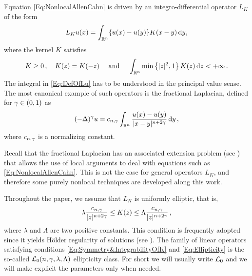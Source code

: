 

Equation \eqref{Eq:NonlocalAllenCahn} is driven by an integro-differential operator $L_K$ of the form
\begin{equation}
\label{Eq:DefOfLu}
L_Ku(x) = \int_{\mathbb{R}^n} \{u(x) - u(y)\} K(x-y)\,\mathrm{d} y,
\end{equation}
where the kernel $K$ satisfies
\begin{equation}
\label{Eq:Symmetry&IntegrabilityOfK}
K\geq 0\,, \quad K(z) = K(-z) \quad \textrm{ and } \quad \int_{\mathbb{R}^n} \min \left\{ |z|^2, 1 \right\} K(z) \,\mathrm{d} z < + \infty\,.
\end{equation}
The integral in \eqref{Eq:DefOfLu} has to be understood in the principal value sense. The most canonical example of such operators is the fractional Laplacian, defined for $\gamma\in(0,1)$ as
$$
(-\Delta)^\gamma u = c_{n, \gamma} \int_{\mathbb{R}^n} \dfrac{u(x) - u(y)}{|x-y|^{n + 2\gamma}}\,\mathrm{d} y\,,
$$
where $c_{n, \gamma}$ is a normalizing constant.

Recall that the fractional Laplacian has an associated extension problem (see \cite{CaffarelliSilvestre}) that allows the use of local arguments to deal with equations such as \eqref{Eq:NonlocalAllenCahn}. This is not the case for general operators $L_K$, and therefore some purely nonlocal techniques are developed along this work. 

Throughout the paper, we assume that $L_K$ is uniformly elliptic, that is,
\begin{equation}
\label{Eq:Ellipticity}
\lambda \dfrac{c_{n,\gamma}}{|z|^{n+2\gamma}} \leq K(z) \leq \Lambda \dfrac{c_{n,\gamma}}{|z|^{n+2\gamma}}\,, 
\end{equation}
where $\lambda$ and $\Lambda$ are two positive constants. This condition is frequently adopted since it yields Hölder regularity of solutions (see \cite{RosOton-Survey,SerraC2s+alphaRegularity}). The family of linear operators satisfying conditions \eqref{Eq:Symmetry&IntegrabilityOfK} and \eqref{Eq:Ellipticity} is the so-called $\mathcal{L}_0(n,\gamma,\lambda, \Lambda)$ ellipticity class. For short we will usually write $\mathcal{L}_0$ and we will make explicit the parameters only when needed. %

